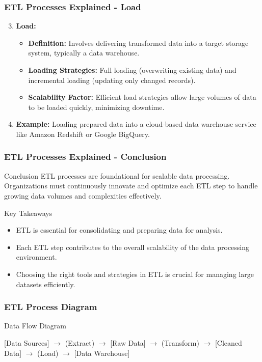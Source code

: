 \documentclass[aspectratio=169]{beamer}
\begin{document}
\begin{frame}[fragile]
    \frametitle{ETL Processes Explained - Load}
    \begin{enumerate}
        \setcounter{enumii}{2} %
        \item \textbf{Load:}
        \begin{itemize}
            \item \textbf{Definition:} Involves delivering transformed data into a target storage system, typically a data warehouse.
            \item \textbf{Loading Strategies:} Full loading (overwriting existing data) and incremental loading (updating only changed records).
            \item \textbf{Scalability Factor:} Efficient load strategies allow large volumes of data to be loaded quickly, minimizing downtime.
        \end{itemize}
        \item \textbf{Example:} Loading prepared data into a cloud-based data warehouse service like Amazon Redshift or Google BigQuery.
    \end{enumerate}
\end{frame}

\begin{frame}[fragile]
    \frametitle{ETL Processes Explained - Conclusion}
    \begin{block}{Conclusion}
        ETL processes are foundational for scalable data processing. Organizations must continuously innovate and optimize each ETL step to handle growing data volumes and complexities effectively.
    \end{block}
    \begin{block}{Key Takeaways}
        \begin{itemize}
            \item ETL is essential for consolidating and preparing data for analysis.
            \item Each ETL step contributes to the overall scalability of the data processing environment.
            \item Choosing the right tools and strategies in ETL is crucial for managing large datasets efficiently.
        \end{itemize}
    \end{block}
\end{frame}

\begin{frame}[fragile]
    \frametitle{ETL Process Diagram}
    \begin{block}{Data Flow Diagram}
    \begin{center}
        [Data Sources] $\rightarrow$ (Extract) $\rightarrow$ [Raw Data] $\rightarrow$ (Transform) $\rightarrow$ [Cleaned Data] $\rightarrow$ (Load) $\rightarrow$ [Data Warehouse]
    \end{center}
    \end{block}
\end{frame}
\end{document}
